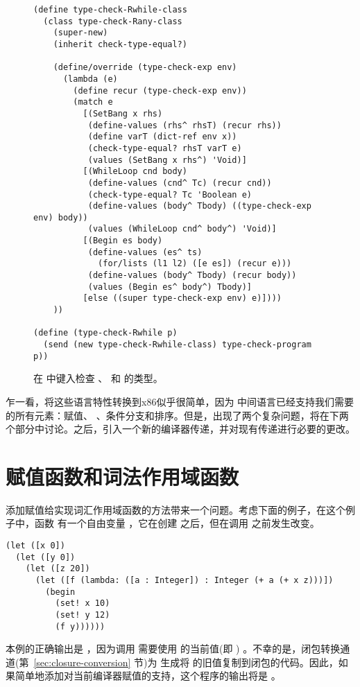 \documentclass[11pt]{book}
\begin{document}
\begin{figure}[tbp]
\begin{lstlisting}
(define type-check-Rwhile-class
  (class type-check-Rany-class
    (super-new)
    (inherit check-type-equal?)

    (define/override (type-check-exp env)
      (lambda (e)
        (define recur (type-check-exp env))
        (match e
          [(SetBang x rhs)
           (define-values (rhs^ rhsT) (recur rhs))
           (define varT (dict-ref env x))
           (check-type-equal? rhsT varT e)
           (values (SetBang x rhs^) 'Void)]
          [(WhileLoop cnd body)
           (define-values (cnd^ Tc) (recur cnd))
           (check-type-equal? Tc 'Boolean e)
           (define-values (body^ Tbody) ((type-check-exp env) body))
           (values (WhileLoop cnd^ body^) 'Void)]
          [(Begin es body)
           (define-values (es^ ts)
             (for/lists (l1 l2) ([e es]) (recur e)))
           (define-values (body^ Tbody) (recur body))
           (values (Begin es^ body^) Tbody)]
          [else ((super type-check-exp env) e)])))
    ))

(define (type-check-Rwhile p)
  (send (new type-check-Rwhile-class) type-check-program p))
\end{lstlisting}
\caption{ 在 \LangLoop{}中键入检查  、  和  的类型。}
\label{fig:type-check-Rwhile}
\end{figure}


  
乍一看，将这些语言特性转换到x86似乎很简单，因为 \LangCFun{} 中间语言已经支持我们需要的所有元素：赋值、  、条件分支和排序。但是，出现了两个复杂问题，将在下两个部分中讨论。之后，引入一个新的编译器传递，并对现有传递进行必要的更改。

\section{赋值函数和词法作用域函数}
\label{sec:assignment-scoping}

添加赋值给实现词汇作用域函数的方法带来一个问题。考虑下面的例子，在这个例子中，函数  有一个自由变量  ，它在创建  之后，但在调用  之前发生改变。
\begin{lstlisting}
(let ([x 0])
  (let ([y 0])
    (let ([z 20])
      (let ([f (lambda: ([a : Integer]) : Integer (+ a (+ x z)))])
        (begin
          (set! x 10)
          (set! y 12)
          (f y))))))
\end{lstlisting}
本例的正确输出是  ，因为调用
 需要使用  的当前值(即
) 。不幸的是，闭包转换通道(第~\ref{sec:closure-conversion} 节)为
 生成将  的旧值复制到闭包的代码。因此，如果简单地添加对当前编译器赋值的支持，这个程序的输出将是 。
\end{document}
